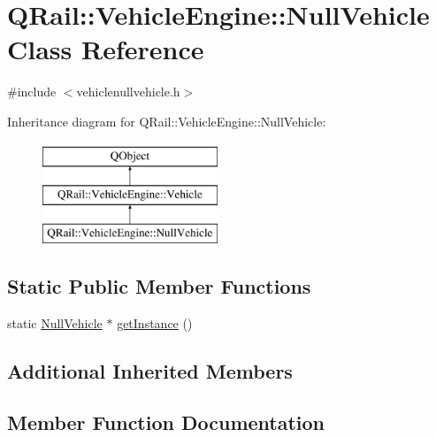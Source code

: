 \hypertarget{classQRail_1_1VehicleEngine_1_1NullVehicle}{}\section{Q\+Rail\+::Vehicle\+Engine\+::Null\+Vehicle Class Reference}
\label{classQRail_1_1VehicleEngine_1_1NullVehicle}


{\ttfamily \#include $<$vehiclenullvehicle.\+h$>$}

Inheritance diagram for Q\+Rail\+::Vehicle\+Engine\+::Null\+Vehicle\+:\begin{figure}[H]
\begin{center}
\leavevmode
\includegraphics[height=3.000000cm]{classQRail_1_1VehicleEngine_1_1NullVehicle}
\end{center}
\end{figure}
\subsection*{Static Public Member Functions}
\begin{DoxyCompactItemize}
\item 
static \mbox{\hyperlink{classQRail_1_1VehicleEngine_1_1NullVehicle}{Null\+Vehicle}} $\ast$ \mbox{\hyperlink{classQRail_1_1VehicleEngine_1_1NullVehicle_a32193025f3412a8720aa2682684fb8f3}{get\+Instance}} ()
\end{DoxyCompactItemize}
\subsection*{Additional Inherited Members}


\subsection{Member Function Documentation}
\mbox{\label{classQRail_1_1VehicleEngine_1_1NullVehicle_a32193025f3412a8720aa2682684fb8f3}} 
